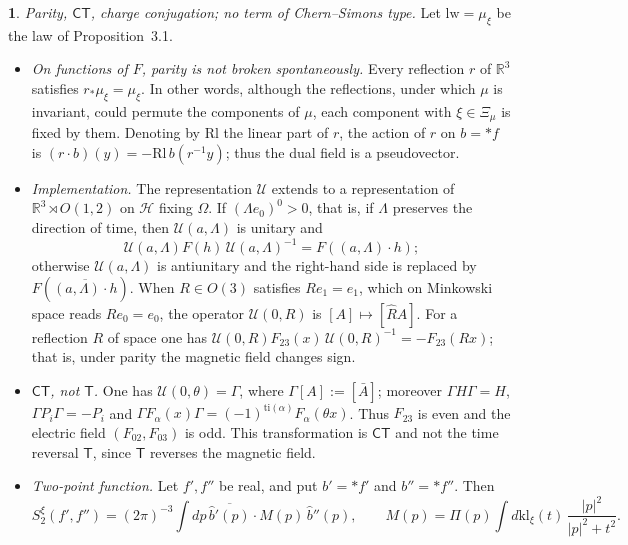 \documentclass[11pt]{amsart}
\newcommand{\namedhead}{}
\theoremstyle{definition}
\newtheorem*{namedinner}{\namedhead}
\newenvironment{named}[1]{\renewcommand{\namedhead}{#1}\begin{namedinner}}{\end{namedinner}}
\begin{document}
\begin{named}{Proposition 3.5}
\emph{Parity, $\mathsf{CT}$, charge conjugation; no term of Chern--Simons type.}
Let $\mathrm{lw}=\mu_\xi$ be the law of Proposition~3.1.
\begin{itemize}
\item[(a)] \emph{On functions of $F$, parity is not broken spontaneously.}
Every reflection $r$ of $\mathbb R^3$ satisfies $r_*\mu_\xi=\mu_\xi$.
In other words, although the reflections, under which $\mu$ is invariant, could permute the components of $\mu$, each component with $\xi\in\Xi_\mu$ is fixed by them.
Denoting by $\mathrm{Rl}$ the linear part of $r$, the action of $r$ on $b=\ast f$ is $(r\cdot b)(y)=-\mathrm{Rl}\,b(r^{-1}y)$; thus the dual field is a pseudovector.
\item[(b)] \emph{Implementation.}
The representation $\mathcal U$ extends to a representation of $\mathbb R^3\rtimes O(1,2)$ on $\mathcal H$ fixing $\Omega$.
If $(\Lambda e_0)^0>0$, that is, if $\Lambda$ preserves the direction of time, then $\mathcal U(a,\Lambda)$ is unitary and
\begin{equation*}
\mathcal U(a,\Lambda)F(h)\,\mathcal U(a,\Lambda)^{-1}=F((a,\Lambda)\cdot h);
\end{equation*}
otherwise $\mathcal U(a,\Lambda)$ is antiunitary and the right-hand side is replaced by $F(\overline{(a,\Lambda)\cdot h})$.
When $R\in O(3)$ satisfies $Re_1=e_1$, which on Minkowski space reads $Re_0=e_0$, the operator $\mathcal U(0,R)$ is $[A]\mapsto[\hat RA]$.
For a reflection $R$ of space one has $\mathcal U(0,R)F_{23}(x)\,\mathcal U(0,R)^{-1}=-F_{23}(Rx)$; that is, under parity the magnetic field changes sign.
\item[(c)] \emph{$\mathsf{CT}$, not $\mathsf T$.}
One has $\mathcal U(0,\theta)=\Gamma$, where $\Gamma[A]:=[\bar A]$; moreover $\Gamma H\Gamma=H$, $\Gamma P_i\Gamma=-P_i$ and $\Gamma F_\alpha(x)\Gamma=\allowbreak (-1)^{\mathrm{ti}(\alpha)}F_\alpha(\theta x)$.
Thus $F_{23}$ is even and the electric field $(F_{02},F_{03})$ is odd.
This transformation is $\mathsf{CT}$ and not the time reversal $\mathsf T$, since $\mathsf T$ reverses the magnetic field.
\item[(d)] \emph{Two-point function.}
Let $f',f''$ be real, and put $b'=\ast f'$ and $b''=\ast f''$.
Then
\begin{equation*}
S_2^\xi(f',f'')=(2\pi)^{-3}\int dp\,\overline{\hat b'(p)}\cdot M(p)\,\hat b''(p),\qquad M(p)=\Pi(p)\int d\mathrm{kl}_\xi(t)\,\frac{|p|^2}{|p|^2+t^2}.
\end{equation*}

\end{itemize}
\end{named}
\end{document}
